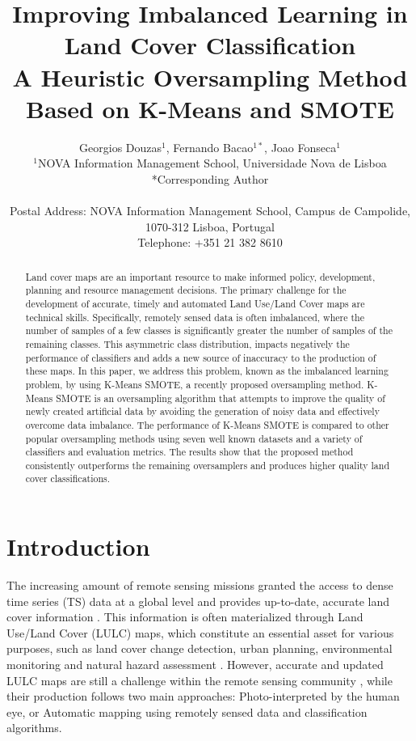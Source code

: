 \documentclass[parskip=full]{scrartcl}
\title{Improving Imbalanced Learning in Land Cover Classification \\ 
	\LARGE{A Heuristic Oversampling Method Based on K-Means and SMOTE}}
\author{
	Georgios Douzas\(^{1}\), Fernando Bacao\(^{1*}\), Joao Fonseca\(^{1}\)
	\\
	\small{\(^{1}\)NOVA Information Management School, Universidade Nova de Lisboa}
	\\
	\small{*Corresponding Author}
	\\
	\\
	\small{Postal Address: NOVA Information Management School, Campus de Campolide, 1070-312 Lisboa, Portugal}
	\\
	\small{Telephone: +351 21 382 8610}
}
\date{}
\begin{document}
\maketitle

\begin{abstract}

    Land cover maps are an important resource to make informed policy,
    development, planning and resource management decisions. The primary
    challenge for the development of accurate, timely and automated Land
    Use/Land Cover maps are technical skills. Specifically, remotely sensed data
    is often imbalanced, where the number of samples of a few classes is
    significantly greater the number of samples of the remaining classes. This
    asymmetric class distribution, impacts negatively the performance of
    classifiers and adds a new source of inaccuracy to the production of these
    maps. In this paper, we address this problem, known as the imbalanced
    learning problem, by using K-Means SMOTE, a recently proposed oversampling
    method. K-Means SMOTE is an oversampling algorithm that attempts to improve
    the quality of newly created artificial data by avoiding the generation of
    noisy data and effectively overcome data imbalance. The performance of
    K-Means SMOTE is compared to other popular oversampling methods using seven
    well known datasets and a variety of classifiers and evaluation metrics. The
    results show that the proposed method consistently outperforms the remaining
    oversamplers and produces higher quality land cover classifications.

\end{abstract}

\section{Introduction}


The increasing amount of remote sensing missions granted the access to dense
time series (TS) data at a global level and provides up-to-date, accurate land
cover information \cite{Drusch2012}. This information is often materialized
through Land Use/Land Cover (LULC) maps, which constitute an essential asset for
various purposes, such as land cover change detection, urban planning,
environmental monitoring and natural hazard assessment \cite{Khatami2016}.
However, accurate and updated LULC maps are still a challenge within the remote
sensing community \cite{Wulder2018}, while their production follows two main
approaches: Photo-interpreted by the human eye, or Automatic mapping using
remotely sensed data and classification algorithms.
\end{document}
